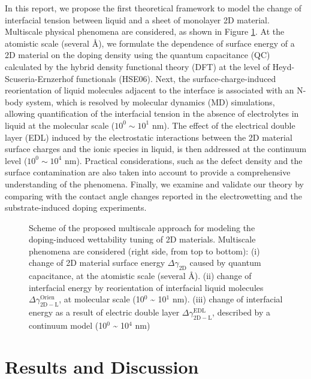 In this report, we propose the first theoretical framework to model
the change of interfacial tension between liquid and a sheet of
monolayer 2D material. Multiscale physical phenomena are considered,
as shown in Figure \ref{fig:scheme-method}. At the atomistic scale
(several \AA{}), we formulate the dependence of surface energy of a 2D
material on the doping density using the quantum capacitance (QC)
calculated by the hybrid density functional theory (DFT) at the level
of Heyd-Scuseria-Ernzerhof functionals (HSE06). Next, the
surface-charge-induced reorientation of liquid molecules adjacent to
the interface is associated with an N-body system, which is resolved
by molecular dynamics (MD) simulations, allowing quantification of the
interfacial tension in the absence of electrolytes in liquid at the
molecular scale (\(10^{0} \sim 10^{1}\) nm). The effect of the electrical
double layer (EDL) induced by the electrostatic interactions between
the 2D material surface charges and the ionic species in liquid, is
then addressed at the continuum level (\(10^{0} \sim 10^{4}\) nm). Practical
considerations, such as the defect density and the surface
contamination are also taken into account to provide a comprehensive
understanding of the phenomena. Finally, we examine and validate our
theory by comparing with the contact angle changes reported in the
electrowetting and the substrate-induced doping experiments.

\begin{figure}[htbp]
\centering
\caption{\label{fig:scheme-method} Scheme of the proposed multiscale
  approach for modeling the doping-induced wettability tuning of 2D
  materials. Multiscale phenomena are considered (right side, from top
  to bottom): (i) change of 2D material surface energy
  \(\Delta \gamma_{\mathrm{2D}}\) caused by quantum capacitance, at
  the atomistic scale (several \AA{}). (ii) change of interfacial
  energy by reorientation of interfacial liquid molecules
  \(\Delta \gamma_{\mathrm{2D-L}} ^{\mathrm{Orien}}\), at molecular
  scale (10\(^{\text{0}}\) \textasciitilde{} 10\(^{\text{1}}\)
  nm). (iii) change of interfacial energy as a result of electric
  double layer \(\Delta \gamma_{\mathrm{2D-L}} ^{\mathrm{EDL}}\),
  described by a continuum model (10\(^{\text{0}}\) \textasciitilde{}
  10\(^{\text{4}}\) nm)}
\end{figure}

\section{Results and Discussion}
\label{sec:orga11172d}

